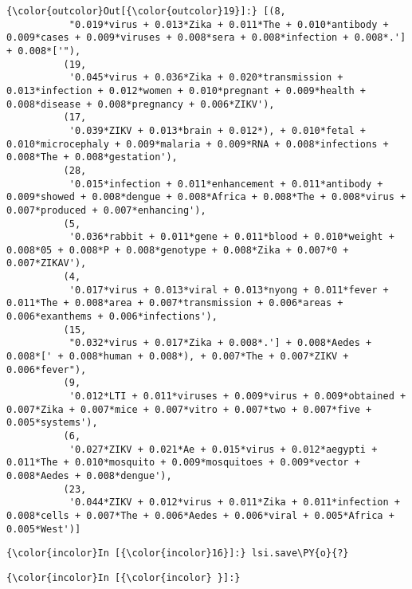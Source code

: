             \begin{Verbatim}[commandchars=\\\{\}]
{\color{outcolor}Out[{\color{outcolor}19}]:} [(8,
           "0.019*virus + 0.013*Zika + 0.011*The + 0.010*antibody + 0.009*cases + 0.009*viruses + 0.008*sera + 0.008*infection + 0.008*.'] + 0.008*['"),
          (19,
           '0.045*virus + 0.036*Zika + 0.020*transmission + 0.013*infection + 0.012*women + 0.010*pregnant + 0.009*health + 0.008*disease + 0.008*pregnancy + 0.006*ZIKV'),
          (17,
           '0.039*ZIKV + 0.013*brain + 0.012*), + 0.010*fetal + 0.010*microcephaly + 0.009*malaria + 0.009*RNA + 0.008*infections + 0.008*The + 0.008*gestation'),
          (28,
           '0.015*infection + 0.011*enhancement + 0.011*antibody + 0.009*showed + 0.008*dengue + 0.008*Africa + 0.008*The + 0.008*virus + 0.007*produced + 0.007*enhancing'),
          (5,
           '0.036*rabbit + 0.011*gene + 0.011*blood + 0.010*weight + 0.008*05 + 0.008*P + 0.008*genotype + 0.008*Zika + 0.007*0 + 0.007*ZIKAV'),
          (4,
           '0.017*virus + 0.013*viral + 0.013*nyong + 0.011*fever + 0.011*The + 0.008*area + 0.007*transmission + 0.006*areas + 0.006*exanthems + 0.006*infections'),
          (15,
           "0.032*virus + 0.017*Zika + 0.008*.'] + 0.008*Aedes + 0.008*[' + 0.008*human + 0.008*), + 0.007*The + 0.007*ZIKV + 0.006*fever"),
          (9,
           '0.012*LTI + 0.011*viruses + 0.009*virus + 0.009*obtained + 0.007*Zika + 0.007*mice + 0.007*vitro + 0.007*two + 0.007*five + 0.005*systems'),
          (6,
           '0.027*ZIKV + 0.021*Ae + 0.015*virus + 0.012*aegypti + 0.011*The + 0.010*mosquito + 0.009*mosquitoes + 0.009*vector + 0.008*Aedes + 0.008*dengue'),
          (23,
           '0.044*ZIKV + 0.012*virus + 0.011*Zika + 0.011*infection + 0.008*cells + 0.007*The + 0.006*Aedes + 0.006*viral + 0.005*Africa + 0.005*West')]
\end{Verbatim}
        
    \begin{Verbatim}[commandchars=\\\{\}]
{\color{incolor}In [{\color{incolor}16}]:} lsi.save\PY{o}{?}
\end{Verbatim}

    \begin{Verbatim}[commandchars=\\\{\}]
{\color{incolor}In [{\color{incolor} }]:} 
\end{Verbatim}


    
    
    
    